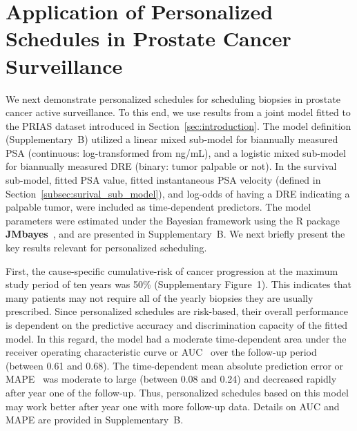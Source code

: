\documentclass[AMA,STIX1COL]{WileyNJD-v2}
\begin{document}
\section{Application of Personalized Schedules in Prostate Cancer Surveillance}
\label{sec:results}
We next demonstrate personalized schedules for scheduling biopsies in prostate cancer active surveillance. To this end, we use results from a joint model fitted to the PRIAS dataset introduced in Section~\ref{sec:introduction}. The model definition (Supplementary~B) utilized a linear mixed sub-model for biannually measured PSA (continuous: log-transformed from ng/mL), and a logistic mixed sub-model for biannually measured DRE (binary: tumor palpable or not). In the survival sub-model, fitted PSA value, fitted instantaneous PSA velocity (defined in Section~\ref{subsec:surival_sub_model}), and log-odds of having a DRE indicating a palpable tumor, were included as time-dependent predictors. The model parameters were estimated under the Bayesian framework using the R package \textbf{JMbayes}~\citep{rizopoulosJMbayes}, and are presented in Supplementary~B. We next briefly present the key results relevant for personalized scheduling.

First, the cause-specific cumulative-risk of cancer progression at the maximum study period of ten years was 50\% (Supplementary Figure~1). This indicates that many patients may not require all of the yearly biopsies they are usually prescribed. Since personalized schedules are risk-based, their overall performance is dependent on the predictive accuracy and discrimination capacity of the fitted model. In this regard, the model had a moderate time-dependent area under the receiver operating characteristic curve or AUC~\citep{landmarking2017} over the follow-up period (between 0.61 and 0.68). The time-dependent mean absolute prediction error or MAPE~\citep{landmarking2017} was moderate to large (between 0.08 and 0.24) and decreased rapidly after year one of the follow-up. Thus, personalized schedules based on this model may work better after year one with more follow-up data. Details on AUC and MAPE are provided in Supplementary~B.
\end{document}
